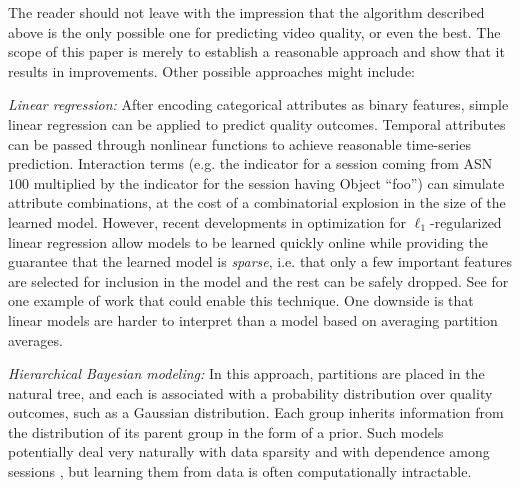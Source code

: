 {
The reader should not leave with the impression that the algorithm described above is the only possible one for predicting video quality, or even the best.  The scope of this paper is merely to establish a reasonable approach and show that it results in improvements.  Other possible approaches might include:
\begin{packedenumerate}
  \item \emph{Linear regression:} After encoding categorical attributes as binary features, simple linear regression can be applied to predict quality outcomes.  Temporal attributes can be passed through nonlinear functions to achieve reasonable time-series prediction.  Interaction terms (e.g. the indicator for a session coming from ASN $100$ multiplied by the indicator for the session having Object ``foo'') can simulate attribute combinations, at the cost of a combinatorial explosion in the size of the learned model.  However, recent developments in optimization for $\ell_1$-regularized linear regression allow models to be learned quickly online while providing the guarantee that the learned model is \emph{sparse}, i.e. that only a few important features are selected for inclusion in the model and the rest can be safely dropped.  See \cite{duchi2010composite} for one example of work that could enable this technique.  One downside is that linear models are harder to interpret than a model based on averaging partition averages.
  \item \emph{Hierarchical Bayesian modeling:} In this approach, partitions are placed in the natural tree, and each is associated with a probability distribution over quality outcomes, such as a Gaussian distribution.  Each group inherits information from the distribution of its parent group in the form of a prior.  Such models potentially deal very naturally with data sparsity and with dependence among sessions \cite{gelman2003bayesian}, but learning them from data is often computationally intractable.
\end{packedenumerate}
}
